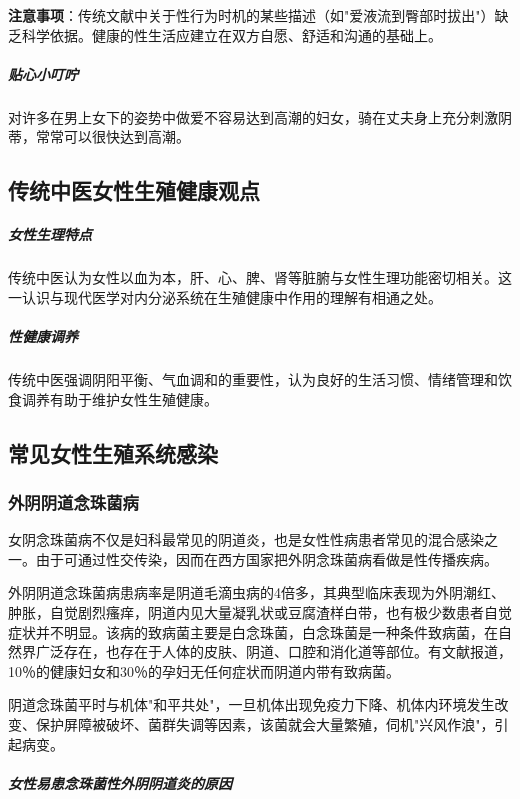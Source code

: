 \begin{enumerate}
\textbf{注意事项}：传统文献中关于性行为时机的某些描述（如"爱液流到臀部时拔出"）缺乏科学依据。健康的性生活应建立在双方自愿、舒适和沟通的基础上。

\subparagraph{贴心小叮咛}

对许多在男上女下的姿势中做爱不容易达到高潮的妇女，骑在丈夫身上充分刺激阴蒂，常常可以很快达到高潮。

\subsection{传统中医女性生殖健康观点}

\subparagraph{女性生理特点}

传统中医认为女性以血为本，肝、心、脾、肾等脏腑与女性生理功能密切相关。这一认识与现代医学对内分泌系统在生殖健康中作用的理解有相通之处。

\subparagraph{性健康调养}

传统中医强调阴阳平衡、气血调和的重要性，认为良好的生活习惯、情绪管理和饮食调养有助于维护女性生殖健康。

\subsection{常见女性生殖系统感染}

\subsubsection{外阴阴道念珠菌病}

女阴念珠菌病不仅是妇科最常见的阴道炎，也是女性性病患者常见的混合感染之一。由于可通过性交传染，因而在西方国家把外阴念珠菌病看做是性传播疾病。

外阴阴道念珠菌病患病率是阴道毛滴虫病的4倍多，其典型临床表现为外阴潮红、肿胀，自觉剧烈瘙痒，阴道内见大量凝乳状或豆腐渣样白带，也有极少数患者自觉症状并不明显。该病的致病菌主要是白念珠菌，白念珠菌是一种条件致病菌，在自然界广泛存在，也存在于人体的皮肤、阴道、口腔和消化道等部位。有文献报道，10％的健康妇女和30％的孕妇无任何症状而阴道内带有致病菌。

阴道念珠菌平时与机体"和平共处"，一旦机体出现免疫力下降、机体内环境发生改变、保护屏障被破坏、菌群失调等因素，该菌就会大量繁殖，伺机"兴风作浪"，引起病变。

\subparagraph{女性易患念珠菌性外阴阴道炎的原因}


\end{enumerate}
